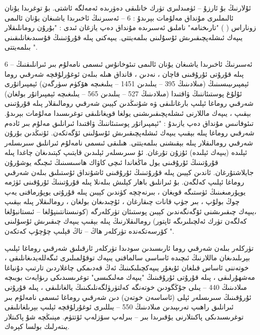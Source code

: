 \documentclass[a4paper]{article}
\begin{document}
ئۇلارنىڭ بۇ ئارزۇ – ئۈمىدلىرى تۈرك خانلىقى دەۋرىدە ئەمەلگە ئاشتى. بۇ توغرىدا يۇنان ئالىملىرى مۇنداق مەلۇمات بېرىدۇ : 6 – ئەسىرنىڭ ئاخىرىدا ياشىغان يۇنان ئالىمى زوناراس ( ) "تارىخنامە" ناملىق ئەسىرىدە مۇنداق دەپ يازغان ئىدى : "بۇرۇن رومانلىقلار يىپەك ئىشلەپچىقىرىش ئۇسۇلىنى بىلمەيتتى. يىپەكنى پىلە قۇرۇتىنىڭ قۇسىدىغانلىقىنى بىلمەيتتى ".



6 – ئەسىرنىڭ ئاخىرىدا ياشىغان يۇنان ئالىمى تىئوخانۇس ئىسمى نامەلۇم بىر ئىرانلىقنىڭ پىلە قۇرۇتى ئۇرۇقىنى قاچان ، نەدىن ، قانداق ھىلە بىلەن ئوغۇرلۇقچە شەرقىي روما ئېمپىرىيىسىنىڭ (مىلادىنىڭ 395 – يىلىدىن 1451 – يىلىغىچە ھۆكۈم سۈرگەن) ئېمپىراتۇرى ئۇلۇغ پوستىئاننىڭ ۋاقتىدا (مىلادىنىڭ 527 – يىلىدىن 565 – يىلىغىچە ئېمپىراتۇر بولغان) شەرقىي روماغا ئېلىپ بارغانلىقى ۋە شۇنىڭدىن كېيىن شەرقىي رومالىقلار پىلە قۇرۇتىنى بېقىپ ، يىپەك ماللارنى ئىشلەپچىقىرىشنى يولغا قويغانلىقى توغرىسىدا مەلۇمات بېرىدۇ. تىئوفانىس مۇنداق دەپ يازىدۇ : "ئېمپىراتۇر پوستىئاننىڭ ۋاقتىدا ئىرانلىق مەلۇم بىر ئادەم شەرقىي روماغا پىلە بېقىپ يىپەك ئىشلەپچىقىرىش ئۇسۇلىنى ئۆگەتكەن. ئۇنىڭدىن بۇرۇن شەرقىي رومالىقلار پىلە بېقىشنى بىلمەيتتى. ھىلىقى ئىسمى نامەلۇم ئىرانلىق سىرىسلەر ئېلىدە (يىپەك ئېلىدە) ئۇزۇن تۇرغان. ئۇ سىرىسلەر ئېلىدىن قايتىپ كېتىدىغان چاغدا پىلە قۇرۇتىنىڭ ئۇرۇقىنى يول ماڭغاندا ئىچى كاۋاك ھاسىسىنىڭ ئىچىگە يوشۇرۇن جايلاشتۇرغان. ئاندىن كېيىن پىلە قۇرۇتىنىڭ ئۇرۇقىنى ئاشۇنداق ئۇستىلىق بىلەن شەرقىي روماغا ئېلىپ كەلگەن. بۇ ئىرانلىق باھار كېلىش بىلەنلا پىلە قۇرۇتىنىڭ ئۇرۇقىنى ئۈژمە يوپۇرمىغىنىڭ ئۈستىگە قويغان ، بىرنەچچە كۈندىن كېيىن پىلە قۇرۇتى يوپۇرماقنى يەپ چوڭ بولۇپ ، بىر جۈپ قانات چىقارغان ، ئۇچىدىغان بولغان ، رومالىقلار پىلە بېقىپ ،يىپەك چىقىرىشنى ئۆگەنگەندىن كېيىن پوستىئان تۈركلەرگە (كونىستانتىنپۇلغا – ئىستانبۇلغا كەلگەن تۈرك ئەلچىلىرىگە ئاپتور) رومالىقلارنىڭ پىلە بېقىپ يىپەك چىقىرىش ئۇسۇلىنى كۆرسەتكەندە تۈركلەر ھاڭ – تاڭ قېلىپ چۇچۇپ كەتكەن ".



تۈركلەر بىلەن شەرقىي روما ئارىسىدىن سودىدا تۈركلەر ئارقىلىق شەرقىي روماغا ئېلىپ بېرىلىدىغان ماللارنىڭ ئىچىدە ئاساسى سالماقنى يىپەك توقۇلمىلىرى ئىگەللەيدىغانلىقى ، خوتەننى ئاساس قىلغان ئۇيغۇر يىپەكچىلىكىنىڭ ئەڭ قەدىمكى چاغلاردىن تارتىپ دۇنياغا مەشھۇرلىقى ، پىلە قۇرۇتى ئۇرۇقىنىڭ "يىپەك مەلىكىسى" توغرىسىدىكى رىۋايەت بويىچە مىلادىنىڭ 440 – يىلى جۇڭگودىن خوتەنگە كەلتۈرۈلگەنلىكىنىڭ يالغانلىقى ، پىلە قۇرۇتى ئۇرۇقىنىڭ سىرىسلەر ئېلى (ئاساسەن خوتەن) دىن شەرقىي روماغا ئىسمى نامەلۇم بىر ئىرانلىق راھىپ تەرىپىدىن مىلادىنىڭ 550 – يىللىرى ئوغۇرلۇقچە ئېلىپ بېرىلغانلىقى توغرىسىدىكى پاكىتلارنى يۇقىرىدا بىر – بىرلەپ سۆزلەپ ئۆتتۈم. مېنىڭچە شۇ پاكىتلار يىتەرلىك بولسا كېرەك.
\end{document}
